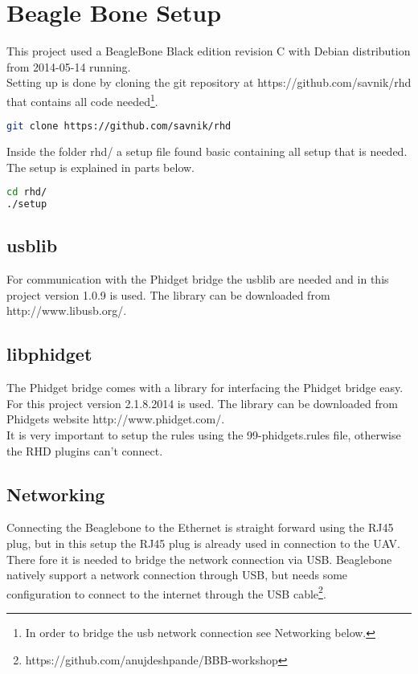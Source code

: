 \chapter{Beagle Bone Setup}
This project used a BeagleBone Black edition revision C with Debian distribution from 2014-05-14 running. \\
Setting up is done by cloning the git repository at https://github.com/savnik/rhd  that contains all code needed\footnote{In order to bridge the usb network connection see Networking below.}.
 \begin{lstlisting}[language=bash]
git clone https://github.com/savnik/rhd
\end{lstlisting}
Inside the folder rhd/ a setup file found basic containing all setup that is needed. The setup is explained in parts below.
\begin{lstlisting}[language=bash]
cd rhd/
./setup
\end{lstlisting} 

\section{usblib} 
For communication with the Phidget bridge the usblib are needed and in this project version 1.0.9 is used. The library can be downloaded from http://www.libusb.org/.

\section{libphidget}
The Phidget bridge comes with a library for interfacing the Phidget bridge easy. For this project version 2.1.8.2014 is used. The library can be downloaded from Phidgets website http://www.phidget.com/.\\
It is very important to setup the rules using the 99-phidgets.rules file, otherwise the RHD plugins can't connect.

\section{Networking}
Connecting the Beaglebone to the Ethernet is straight forward using the RJ45 plug, but in this setup the RJ45 plug is already used in connection to the UAV. There fore it is needed to bridge the network connection via USB. Beaglebone natively support a network connection through USB, but needs some configuration to connect to the internet through the USB cable\footnote{https://github.com/anujdeshpande/BBB-workshop}.

